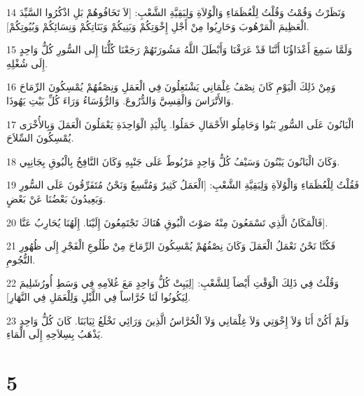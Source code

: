 \par 14 وَنَظَرْتُ وَقُمْتُ وَقُلْتُ لِلْعُظَمَاءِ وَالْوُلاَةِ وَلِبَقِيَّةِ الشَّعْبِ: [لاَ تَخَافُوهُمْ بَلِ اذْكُرُوا السَّيِّدَ الْعَظِيمَ الْمَرْهُوبَ وَحَارِبُوا مِنْ أَجْلِ إِخْوَتِكُمْ وَبَنِيكُمْ وَبَنَاتِكُمْ وَنِسَائِكُمْ وَبُيُوتِكُمْ].
\par 15 وَلَمَّا سَمِعَ أَعْدَاؤُنَا أَنَّنَا قَدْ عَرَفْنَا وَأَبْطَلَ اللَّهُ مَشُورَتَهُمْ رَجَعْنَا كُلُّنَا إِلَى السُّورِ كُلُّ وَاحِدٍ إِلَى شُغْلِهِ.
\par 16 وَمِنْ ذَلِكَ الْيَوْمِ كَانَ نِصْفُ غِلْمَانِي يَشْتَغِلُونَ فِي الْعَمَلِ وَنِصْفُهُمْ يُمْسِكُونَ الرِّمَاحَ وَالأَتْرَاسَ وَالْقِسِيَّ وَالدُّرُوعَ. وَالرُّؤَسَاءُ وَرَاءَ كُلِّ بَيْتِ يَهُوذَا.
\par 17 الْبَانُونَ عَلَى السُّورِ بَنُوا وَحَامِلُو الأَحْمَالِ حَمَلُوا. بِالْيَدِ الْوَاحِدَةِ يَعْمَلُونَ الْعَمَلَ وَبِالأُخْرَى يُمْسِكُونَ السِّلاَحَ.
\par 18 وَكَانَ الْبَانُونَ يَبْنُونَ وَسَيْفُ كُلُّ وَاحِدٍ مَرْبُوطٌ عَلَى جَنْبِهِ وَكَانَ النَّافِخُ بِالْبُوقِ بِجَانِبِي.
\par 19 فَقُلْتُ لِلْعُظَمَاءِ وَالْوُلاَةِ وَلِبَقِيَّةِ الشَّعْبِ: [الْعَمَلُ كَثِيرٌ وَمُتَّسِعٌ وَنَحْنُ مُتَفَرِّقُونَ عَلَى السُّورِ وَبَعِيدُونَ بَعْضُنَا عَنْ بَعْضٍ.
\par 20 فَالْمَكَانُ الَّذِي تَسْمَعُونَ مِنْهُ صَوْتَ الْبُوقِ هُنَاكَ تَجْتَمِعُونَ إِلَيْنَا. إِلَهُنَا يُحَارِبُ عَنَّا].
\par 21 فَكُنَّا نَحْنُ نَعْمَلُ الْعَمَلَ وَكَانَ نِصْفُهُمْ يُمْسِكُونَ الرِّمَاحَ مِنْ طُلُوعِ الْفَجْرِ إِلَى ظُهُورِ النُّجُومِ.
\par 22 وَقُلْتُ فِي ذَلِكَ الْوَقْتِ أَيْضاً لِلشَّعْبِ: [لِيَبِتْ كُلُّ وَاحِدٍ مَعَ غُلاَمِهِ فِي وَسَطِ أُورُشَلِيمَ لِيَكُونُوا لَنَا حُرَّاساً فِي اللَّيْلِ وَلِلْعَمَلِ فِي النَّهَارِ].
\par 23 وَلَمْ أَكُنْ أَنَا وَلاَ إِخْوَتِي وَلاَ غِلْمَانِي وَلاَ الْحُرَّاسُ الَّذِينَ وَرَائِي نَخْلَعُ ثِيَابَنَا. كَانَ كُلُّ وَاحِدٍ يَذْهَبُ بِسِلاَحِهِ إِلَى الْمَاءِ.

\chapter{5}

